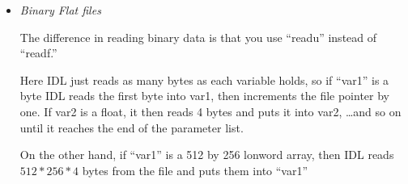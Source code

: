 \begin{itemize}
\begin{itemize}
 	\footnote{the
        /get\_lun tells IDL to allocate a LUN just as if you called
        the procedure  }\\
	\\
	\\
	\\
	\\
	\\
	\\
	\\
	\\

        Of course it's even easier if the data is all of the same
        type, then you don't need to do any conversions.

	Some time you should compare this method with looping, it
        should be about 10 times faster.

	This method won't work so well if one of the fields is a
        'string', even if it's a fixed length. Without fancy formating
        string variables are greedy, they consume the
        rest of the line so that the variables that remain in the
        parameter list of the ``read'' start consuming fields from the
        next line.\footnote{this is the one exception I know of the
	rule that each read consumes one line of the file} Usually I
	read such files into a string vector having as many entries as
	rows in the file,then loop through this vector calling
	 on each elements of the
	vector.

	\item \textit{Binary Flat files}

	The difference in reading binary data is that you use
        ``readu'' instead of ``readf.''



	Here IDL just reads as many bytes as each variable holds, so
	if ``var1'' is a byte IDL reads the first byte into var1, then
	increments the file pointer by one. If var2 is a float, it then
	reads 4 bytes and puts it into var2, \ldots and so on until it
	reaches the end of the parameter list.

	On the other hand, if ``var1'' is a 512 by 256 lonword array,
	then IDL reads $512 *256*4$ bytes from the file and puts them
	into ``var1''


\end{itemize}
\end{itemize}
